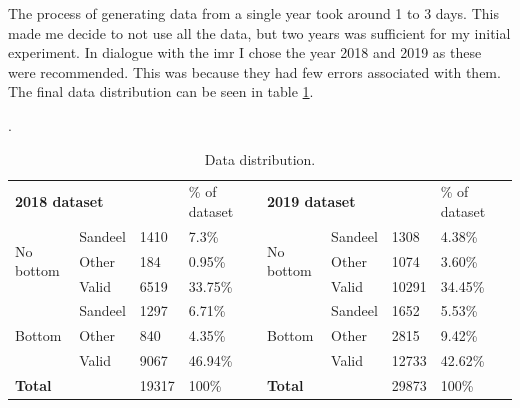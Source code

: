         The process of generating data from a single year took around 1 to 3 days. This made me decide to not use all the data, but two years was sufficient for my initial experiment. In dialogue with the \gls{imr} I chose the year 2018 and 2019 as these were recommended. This was because they had few errors associated with them. The final data distribution can be seen in table \ref{data_distribution_table}.
        
        \clearpage
        \begin{table}[H]
        \caption{Data distribution.}.
        \begin{tabular}{|llll|l|l|lllll|l|l}
        \cline{1-5} \cline{7-12}
        \multicolumn{4}{|l|}{\textbf{2018 dataset}}                                             & \% of dataset &  & \multicolumn{5}{l|}{\textbf{2019 dataset}}                                             & \% of dataset &  \\ \cline{1-5} \cline{7-12}
        \multicolumn{2}{|l|}{\multirow{3}{*}{No bottom}} & \multicolumn{1}{l|}{Sandeel} & 1410  & 7.3\%         &  & \multicolumn{3}{l|}{\multirow{3}{*}{No bottom}} & \multicolumn{1}{l|}{Sandeel} & 1308  & 4.38\%        &  \\ \cline{3-5} \cline{10-12}
        \multicolumn{2}{|l|}{}                           & \multicolumn{1}{l|}{Other}   & 184   & 0.95\%        &  & \multicolumn{3}{l|}{}                           & \multicolumn{1}{l|}{Other}   & 1074  & 3.60\%         &  \\ \cline{3-5} \cline{10-12}
        \multicolumn{2}{|l|}{}                           & \multicolumn{1}{l|}{Valid}   & 6519  & 33.75\%       &  & \multicolumn{3}{l|}{}                           & \multicolumn{1}{l|}{Valid}   & 10291 & 34.45\%       &  \\ \cline{1-5} \cline{7-12}
        \multicolumn{2}{|l|}{\multirow{3}{*}{Bottom}}    & \multicolumn{1}{l|}{Sandeel} & 1297  & 6.71\%        &  & \multicolumn{3}{l|}{\multirow{3}{*}{Bottom}}    & \multicolumn{1}{l|}{Sandeel} & 1652  & 5.53\%        &  \\ \cline{3-5} \cline{10-12}
        \multicolumn{2}{|l|}{}                           & \multicolumn{1}{l|}{Other}   & 840   & 4.35\%        &  & \multicolumn{3}{l|}{}                           & \multicolumn{1}{l|}{Other}   & 2815  & 9.42\%        &  \\ \cline{3-5} \cline{10-12}
        \multicolumn{2}{|l|}{}                           & \multicolumn{1}{l|}{Valid}   & 9067  & 46.94\%       &  & \multicolumn{3}{l|}{}                           & \multicolumn{1}{l|}{Valid}   & 12733 & 42.62\%       &  \\ \cline{1-5} \cline{7-12}
        \multicolumn{3}{|l|}{\textbf{Total}}                                            & 19317 & 100\%         &  & \multicolumn{4}{l|}{\textbf{Total}}                                            & 29873 & 100\%         &  \\ \cline{1-5} \cline{7-12}
        \end{tabular}
        \label{data_distribution_table}
        \end{table}
        
